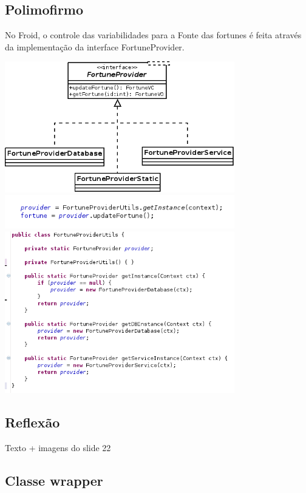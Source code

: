 \subsection{Polimofirmo}
No Froid, o controle das variabilidades para a Fonte das fortunes é feita através 
da implementação da interface FortuneProvider.

\includegraphics[width=10cm]{img/implementacao_FortuneProvider}
\includegraphics[width=10cm]{img/instaciando_provider}
\includegraphics[width=10cm]{img/FortuneProviderUtils}
\subsection{Reflexão}

Texto + imagens do slide 22

\subsection{Classe wrapper}

